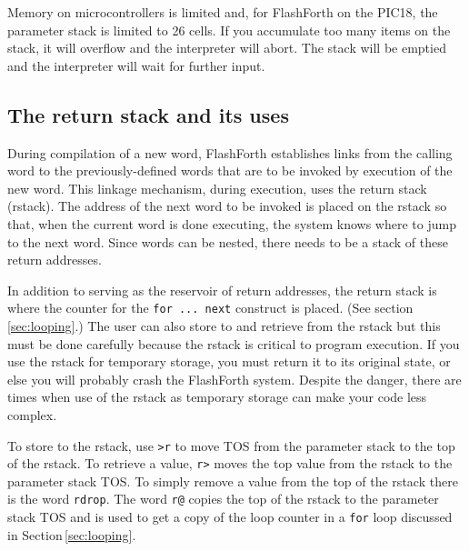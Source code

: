 \documentclass[12pt,a4paper]{article}
\begin{document}
\medskip
Memory on microcontrollers is limited and,
for FlashForth on the PIC18, the parameter stack is limited to 26 cells.
If you accumulate too many items on the stack, it will overflow and the interpreter will abort.
The stack will be emptied and the interpreter will wait for further input.

\medskip
\subsection{The return stack and its uses}
\label{sec:return-stack}
%
During compilation of a new word, FlashForth establishes links from the calling word
to the previously-defined words that are to be invoked by execution of the new word.
This linkage mechanism, during execution, uses the return stack (rstack).
The address of the next word to be invoked is placed on the rstack so that,
when the current word is done executing, the system knows where to jump 
to the next word.
Since words can be nested, there needs to be a stack of these return addresses.

\medskip
In addition to serving as the reservoir of return addresses, 
the return stack is where the counter for the \verb!for ... next! construct is placed.
(See section\,\ref{sec:looping}.)
The user can also store to and retrieve from the rstack but this must be done carefully
because the rstack is critical to program execution.
If you use the rstack for temporary storage, you must return it to its original state,
or else you will probably crash the FlashForth system.
Despite the danger, there are times when use of the rstack as temporary storage can make
your code less complex.

\medskip
To store to the rstack, use \verb!>r! to move TOS from the parameter stack 
to the top of the rstack.
To retrieve a value, \verb!r>! moves the top value from the rstack 
to the parameter stack TOS.
To simply remove a value from the top of the rstack there is the word \verb!rdrop!.
The word \verb!r@! copies the top of the rstack to the parameter stack TOS 
and is used to get a copy of the loop counter in a \verb!for! loop 
discussed in Section\,\ref{sec:looping}. 


\newpage
\end{document}
